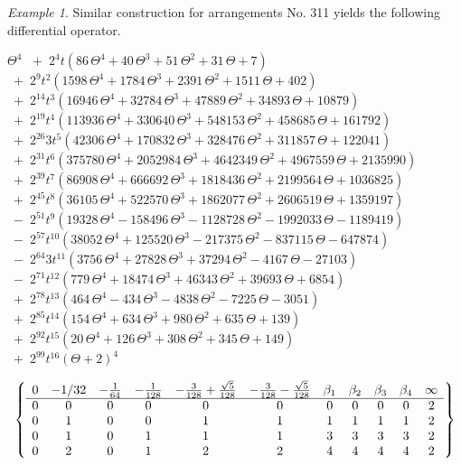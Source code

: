 \documentclass[12pt]{amsart}
\theoremstyle{plain}
\theoremstyle{remark}
\newtheorem{exmp}{Example}
\theoremstyle{definition}
\numberwithin{table}{section}
\begin{document}
\begin{exmp}\leavevmode
	Similar construction for arrangements No. 311 yields the following differential operator.
\begin{center}
	\(\displaystyle {\Theta}^{4}\)
	\mbox{\(\displaystyle\; + \; 2 ^{4}t(86\,{\Theta}^{4}+40\,{\Theta}^{3}+51\,{\Theta}^{2}+31\,\Theta+7)\)}
	\mbox{\(\displaystyle\; + \; 2 ^{9}t^{2}(1598\,{\Theta}^{4}+1784\,{\Theta}^{3}+2391\,{\Theta}^{2}+1511\,\Theta+402)\)}
	\mbox{\(\displaystyle\; + \; 2 ^{14}t^{3}(16946\,{\Theta}^{4}+32784\,{\Theta}^{3}+47889\,{\Theta}^{2}+34893\,\Theta+10879)\)}
	\mbox{\(\displaystyle\; + \; 2 ^{19}t^{4}(113936\,{\Theta}^{4}+330640\,{\Theta}^{3}+548153\,{\Theta}^{2}+458685\,\Theta+161792)\)}
	\mbox{\(\displaystyle\; + \; 2 ^{26} 3 t^{5}(42306\,{\Theta}^{4}+170832\,{\Theta}^{3}+328476\,{\Theta}^{2}+311857\,\Theta+122041)\)}
	\mbox{\(\displaystyle\; + \; 2 ^{31}t^{6}(375780\,{\Theta}^{4}+2052984\,{\Theta}^{3}+4642349\,{\Theta}^{2}+4967559\,\Theta+2135990)\)}
	\mbox{\(\displaystyle\; + \; 2 ^{39}t^{7}(86908\,{\Theta}^{4}+666692\,{\Theta}^{3}+1818436\,{\Theta}^{2}+2199564\,\Theta+1036825)\)}
	\mbox{\(\displaystyle\; + \; 2 ^{45}t^{8}(36105\,{\Theta}^{4}+522570\,{\Theta}^{3}+1862077\,{\Theta}^{2}+2606519\,\Theta+1359197)\)}
	\mbox{\(\displaystyle\; - \; 2 ^{51}t^{9}(19328\,{\Theta}^{4}-158496\,{\Theta}^{3}-1128728\,{\Theta}^{2}-1992033\,\Theta-1189419)\)}
	\mbox{\(\displaystyle\; - \; 2 ^{57}t^{10}(38052\,{\Theta}^{4}+125520\,{\Theta}^{3}-217375\,{\Theta}^{2}-837115\,\Theta-647874)\)}
	\mbox{\(\displaystyle\; - \; 2 ^{64} 3 t^{11}(3756\,{\Theta}^{4}+27828\,{\Theta}^{3}+37294\,{\Theta}^{2}-4167\,\Theta-27103)\)}
	\mbox{\(\displaystyle\; - \; 2 ^{71}t^{12}(779\,{\Theta}^{4}+18474\,{\Theta}^{3}+46343\,{\Theta}^{2}+39693\,\Theta+6854)\)}
	\mbox{\(\displaystyle\; + \; 2 ^{78}t^{13}(464\,{\Theta}^{4}-434\,{\Theta}^{3}-4838\,{\Theta}^{2}-7225\,\Theta-3051)\)}
	\mbox{\(\displaystyle\; + \; 2 ^{85}t^{14}(154\,{\Theta}^{4}+634\,{\Theta}^{3}+980\,{\Theta}^{2}+635\,\Theta+139)\)}
	\mbox{\(\displaystyle\; + \; 2 ^{92}t^{15}(20\,{\Theta}^{4}+126\,{\Theta}^{3}+308\,{\Theta}^{2}+345\,\Theta+149)\)}\\
	\mbox{\(\displaystyle\; + \; 2 ^{99}t^{16}(\Theta+2)^{4}\)}
\end{center}

\[\left\{\begin{array}{*{11}c}
	0& -1/32& -{\frac{1}{64}}& -{\frac{1}{128}}& -{\frac{3}{128}}+{\frac {\sqrt {5}}{128}}& -{\frac{3}{128}}-{\frac {\sqrt {5}}{128}}& \beta_{1} & \beta_{2} & \beta_{3} & \beta_{4} & \infty \\
	\hline0 & 0 & 0 & 0 & 0 & 0 & 0 & 0 & 0 & 0 & 2 \\
	0 & 1 & 0 & 0 & 1 & 1 & 1 & 1 & 1 & 1 & 2 \\
	0 & 1 & 0 & 1 & 1 & 1 & 3 & 3 & 3 & 3 & 2 \\
	0 & 2 & 0 & 1 & 2 & 2 & 4 & 4 & 4 & 4 & 2 \\
\end{array}\right\}\]



\end{exmp}
\end{document}

